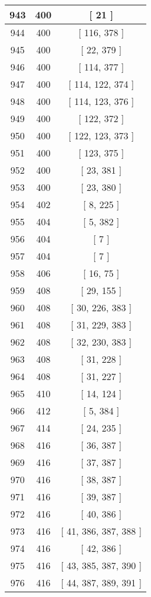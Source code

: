 \begin{center}
\begin{longtable}[H]{|| c c c ||}
\hline
943 & 400 & [ 21 ] \\ 
\hline
944 & 400 & [ 116, 378 ] \\ 
\hline
945 & 400 & [ 22, 379 ] \\ 
\hline
946 & 400 & [ 114, 377 ] \\ 
\hline
947 & 400 & [ 114, 122, 374 ] \\ 
\hline
948 & 400 & [ 114, 123, 376 ] \\ 
\hline
949 & 400 & [ 122, 372 ] \\ 
\hline
950 & 400 & [ 122, 123, 373 ] \\ 
\hline
951 & 400 & [ 123, 375 ] \\ 
\hline
952 & 400 & [ 23, 381 ] \\ 
\hline
953 & 400 & [ 23, 380 ] \\ 
\hline
954 & 402 & [ 8, 225 ] \\ 
\hline
955 & 404 & [ 5, 382 ] \\ 
\hline
956 & 404 & [ 7 ] \\ 
\hline
957 & 404 & [ 7 ] \\ 
\hline
958 & 406 & [ 16, 75 ] \\ 
\hline
959 & 408 & [ 29, 155 ] \\ 
\hline
960 & 408 & [ 30, 226, 383 ] \\ 
\hline
961 & 408 & [ 31, 229, 383 ] \\ 
\hline
962 & 408 & [ 32, 230, 383 ] \\ 
\hline
963 & 408 & [ 31, 228 ] \\ 
\hline
964 & 408 & [ 31, 227 ] \\ 
\hline
965 & 410 & [ 14, 124 ] \\ 
\hline
966 & 412 & [ 5, 384 ] \\ 
\hline
967 & 414 & [ 24, 235 ] \\ 
\hline
968 & 416 & [ 36, 387 ] \\ 
\hline
969 & 416 & [ 37, 387 ] \\ 
\hline
970 & 416 & [ 38, 387 ] \\ 
\hline
971 & 416 & [ 39, 387 ] \\ 
\hline
972 & 416 & [ 40, 386 ] \\ 
\hline
973 & 416 & [ 41, 386, 387, 388 ] \\ 
\hline
974 & 416 & [ 42, 386 ] \\ 
\hline
975 & 416 & [ 43, 385, 387, 390 ] \\ 
\hline
976 & 416 & [ 44, 387, 389, 391 ] \\ 
\hline

\end{longtable}
\end{center}
